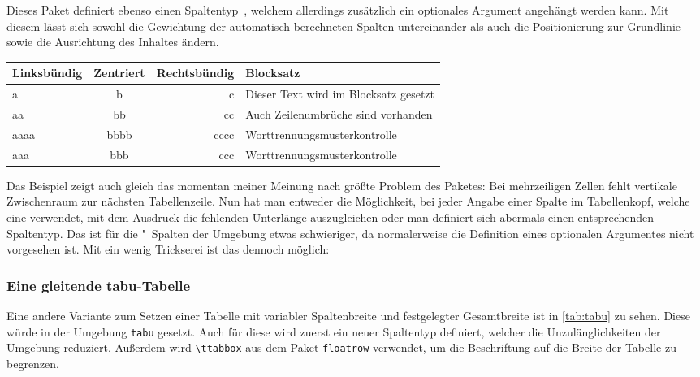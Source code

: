 \documentclass[%
  english,ngerman,%
  geometry=no,DIV=12,automark,%
]{tudscrartcl}
\makeatletter
\newcommand*\pcolumnfuzz[1]{\pretocmd{\@endpbox}{\hfuzz=#1}{}{}}
\makeatother
\begin{document}
Dieses Paket definiert ebenso einen Spaltentyp~, welchem allerdings 
zusätzlich ein optionales Argument angehängt werden kann. Mit diesem lässt sich 
sowohl die Gewichtung der automatisch berechneten Spalten untereinander als 
auch die Positionierung zur Grundlinie sowie die Ausrichtung des Inhaltes 
ändern.
%
\begingroup
\pcolumnfuzz{70pt}
\begin{Hint*}
\begin{tabu} to 11.7cm {lcrX}
\toprule
\textbf{Linksbündig} & \textbf{Zentriert} & 
\textbf{Rechtsbündig} & \textbf{Blocksatz} \tabularnewline
\midrule
a    & b    & c    & Dieser Text wird im Blocksatz gesetzt\tabularnewline
aa   & bb   & cc   & Auch Zeilenumbrüche sind vorhanden\tabularnewline
aaaa & bbbb & cccc & Worttrennungsmus\-terkontrolle\tabularnewline
aaa  & bbb  & ccc  & Worttrennungsmusterkontrolle\tabularnewline
\bottomrule
\end{tabu}
\end{Hint*}
\endgroup
%
Das Beispiel zeigt auch gleich das momentan meiner Meinung nach größte Problem 
des Paketes: Bei mehrzeiligen Zellen fehlt vertikale Zwischenraum zur nächsten 
Tabellenzeile. Nun hat man entweder die Möglichkeit, bei jeder Angabe einer 
Spalte im Tabellenkopf, welche eine  verwendet, mit dem Ausdruck 
 die fehlenden Unterlänge auszugleichen oder man 
definiert sich abermals einen entsprechenden Spaltentyp. Das ist für die 
"~Spalten der Umgebung  etwas schwieriger, da 
 normalerweise die Definition eines optionalen Argumentes 
nicht vorgesehen ist. Mit ein wenig Trickserei ist das dennoch möglich:
%
\begin{Trunk+}
\subsubsection{Eine gleitende tabu-Tabelle}
Eine andere Variante zum Setzen einer Tabelle mit variabler Spaltenbreite 
und festgelegter Gesamtbreite ist in \autoref{tab:tabu} zu sehen. Diese 
würde in der Umgebung \texttt{tabu} gesetzt. Auch für diese wird zuerst 
ein neuer Spaltentyp definiert, welcher die Unzulänglichkeiten der 
Umgebung reduziert. Außerdem wird \texttt{\textbackslash ttabbox} aus dem 
Paket \texttt{floatrow} verwendet, um die Beschriftung auf die Breite der 
Tabelle zu begrenzen.

\end{Trunk+}
\CodeHook{\renewcommand*{\newcolumntype}[2]{}}
\begin{Trunk*}
\makeatletter
\newcolumntype{Z}{}
\renewcommand*\NC@rewrite@Z[1][]{%
  \NC@find>{\hspace{0pt}}X[#1]<{\@finalstrut\@arstrutbox}%
}
\makeatother

\end{Trunk*}
\end{document}
